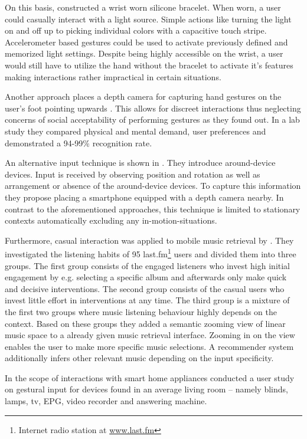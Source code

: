 On this basis, \cite{Busse2014Thesis} constructed a wrist worn silicone bracelet. When worn, a user could casually interact with a light source. Simple actions like turning the light on and off up to picking individual colors with a capacitive touch stripe. Accelerometer based gestures could be used to activate previously defined and memorized light settings. Despite being highly accessible on the wrist, a user would still have to utilize the hand without the bracelet to activate it's features making interactions rather impractical in certain situations.

Another approach places a depth camera for capturing hand gestures on the user's foot pointing upwards \cite{bailly2012shoesense}. This allows for discreet interactions thus neglecting concerns of social acceptability of performing gestures as they found out. In a lab study they compared physical and mental demand, user preferences and demonstrated a 94-99\% recognition rate.

An alternative input technique is shown in \cite{pohl2014around}. They introduce around-device devices. Input is received by observing position and rotation as well as arrangement or absence of the around-device devices. To capture this information they propose placing a smartphone equipped with a depth camera nearby.  In contrast to the aforementioned approaches, this technique is limited to stationary contexts automatically excluding any in-motion-situations.

Furthermore, casual interaction was applied to mobile music retrieval by \cite{boland2015engaging}. They investigated the listening habits of 95 last.fm\footnote{Internet radio station at \url{www.last.fm}} users and divided them into three groups. The first group consists of the engaged listeners who invest high initial engagement by e.g. selecting a specific album and afterwards only make quick and decisive interventions. The second group consists of the casual users who invest little effort in interventions at any time. The third group is a mixture of the first two groups where music listening behaviour highly depends on the context. Based on these groups they added a semantic zooming view of linear music space to a already given music retrieval interface. Zooming in on the view enables the user to make more specific music selections. A recommender system additionally infers other relevant music depending on the input specificity.

In the scope of interactions with smart home appliances \cite{kuhnel2011m} conducted a user study on gestural input for devices found in an average living room -- namely blinds, lamps, tv, \ac{EPG}, video recorder and answering machine.







